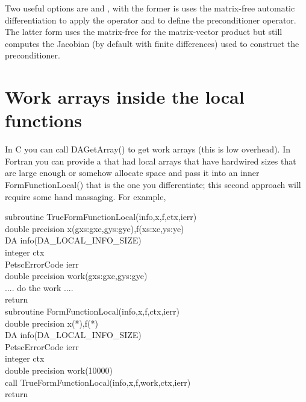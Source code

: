 Two useful options are  and ,
with the former is uses the matrix-free automatic differentiation to apply the operator
and to define the preconditioner operator. The latter form uses the matrix-free for the 
matrix-vector product but still computes the Jacobian (by default with finite differences)
used to construct the preconditioner.

\section{Work arrays inside the local functions} In C you can call DAGetArray() to get 
work arrays (this is low overhead). In Fortran you can provide a 
that had local arrays that have hardwired sizes that are large enough or somehow allocate
space and pass it into an inner FormFunctionLocal() that is the one you differentiate; this
second approach will require some hand massaging. For example,

\begin{tabbing}
  subroutine TrueFormFunctionLocal(info,x,f,ctx,ierr)\\
  double precision x(gxs:gxe,gys:gye),f(xs:xe,ys:ye)\\
  DA info(DA\_LOCAL\_INFO\_SIZE)\\
  integer ctx\\
  PetscErrorCode ierr\\
  double precision work(gxs:gxe,gys:gye)\\
   
  .... do the work ....\\


  return\\
   
  subroutine FormFunctionLocal(info,x,f,ctx,ierr)\\

  double precision x(*),f(*)\\
  DA info(DA\_LOCAL\_INFO\_SIZE)\\
  PetscErrorCode ierr\\
  integer ctx\\
  double precision work(10000)\\

  call TrueFormFunctionLocal(info,x,f,work,ctx,ierr)\\
  return
\end{tabbing}


